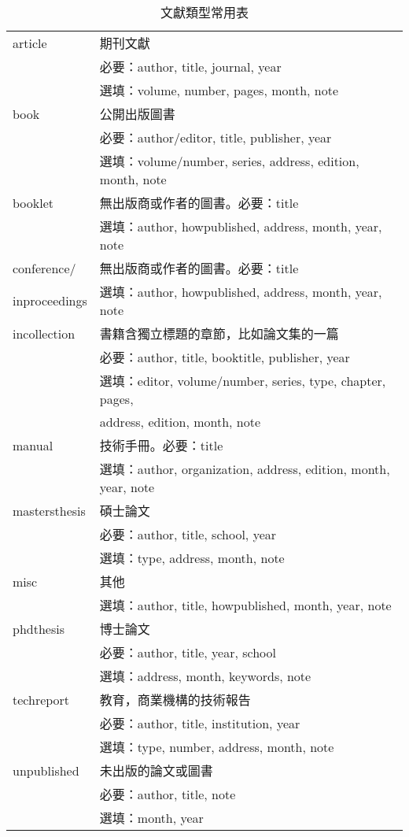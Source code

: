 \begin{table}[!htb]
\centering
\caption{\bibtex 文獻類型常用表}
\label{tab:bibtype}
\begin{tabular}{>{\ttfamily}ll}
\hline
article & 期刊文獻 \\
& 必要：author, title, journal, year \\
& 選填：volume, number, pages, month, note \\
\hline
book & 公開出版圖書 \\
& 必要：author/editor, title, publisher, year \\
& 選填：volume/number, series, address, edition, month, note \\
\hline
booklet & 無出版商或作者的圖書。必要：title\\
& 選填：author, howpublished, address, month, year, note \\
\hline
conference/ & 無出版商或作者的圖書。必要：title \\
inproceedings & 選填：author, howpublished, address, month, year, note \\
\hline
incollection & 書籍含獨立標題的章節，比如論文集的一篇 \\
& 必要：author, title, booktitle, publisher, year \\
& 選填：editor, volume/number, series, type, chapter, pages, \\
& address, edition, month, note \\
\hline
manual & 技術手冊。必要：title \\
& 選填：author, organization, address, edition, month, year, note \\
\hline
mastersthesis & 碩士論文\\
& 必要：author, title, school, year \\
& 選填：type, address, month, note\\
\hline
misc & 其他 \\
& 選填：author, title, howpublished, month, year, note \\
\hline
phdthesis & 博士論文 \\
& 必要：author, title, year, school\\
& 選填：address, month, keywords, note\\
\hline
techreport & 教育，商業機構的技術報告\\
& 必要：author, title, institution, year\\
& 選填：type, number, address, month, note\\
\hline
unpublished & 未出版的論文或圖書\\
& 必要：author, title, note\\
& 選填：month, year\\
\hline
\end{tabular}
\end{table}


